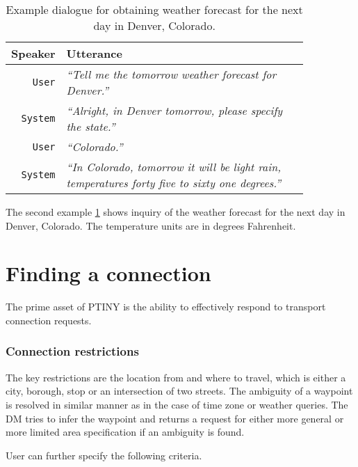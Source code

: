 \begin{table}[h]
\centering
\begin{tabular}{ | r | p{0.85\linewidth} | } \hline
	\textbf{Speaker} & \textbf{Utterance} \\ \hline
	\texttt{User} & \textit{``Tell me the tomorrow weather forecast for Denver.''} \\ \hline
	\texttt{System} & \textit{``Alright, in Denver tomorrow, please specify the state.''} \\ \hline
	\texttt{User} & \textit{``Colorado.''} \\ \hline
	\texttt{System} & \textit{``In Colorado, tomorrow it will be light rain, temperatures forty five to sixty one degrees.''} \\ \hline
\end{tabular}
\caption[Weather forecast for the next day in Denver, Colorado]{Example dialogue for obtaining weather forecast for the next day in Denver, Colorado.}
\label{table:forecast}
\end{table}

The second example \ref{table:forecast} shows inquiry of the weather forecast for the next day in Denver, Colorado.
The temperature units are in degrees Fahrenheit.

\section{Finding a connection}

The prime asset of PTINY is the ability to effectively respond to transport connection requests.

\subsubsection{Connection restrictions}

The key restrictions are the location from and where to travel, which is either a city, borough, stop or an intersection of two streets.
The ambiguity of a waypoint is resolved in similar manner as in the case of time zone or weather queries.
The DM tries to infer the waypoint and returns a request for either more general or more limited area specification if an ambiguity is found.

User can further specify the following criteria.


